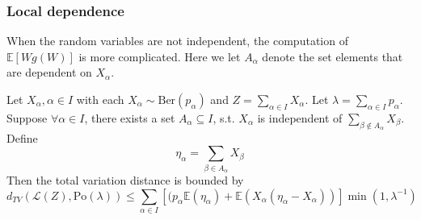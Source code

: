 \documentclass{article}
\begin{document}
\subsubsection{Local dependence}  
When the random variables are not independent, the computation of $\mathbb{E}[Wg(W)]$ is more complicated.  Here we let $A_\alpha$ denote the set elements that are dependent on $X_\alpha$.  

\begin{theorem}\label{thm:poisson_stein_local}
    Let $X_\alpha, \alpha \in I$ with each $X_\alpha \sim \text{Ber}(p_\alpha)$ and $Z = \sum_{\alpha \in I} X_\alpha$. Let $\lambda = \sum_{\alpha \in I} p_\alpha$. Suppose $\forall \alpha \in I$, there exists a set $A_\alpha \subseteq I$, s.t. $X_\alpha$ is independent of $\sum_{\beta \notin A_\alpha} X_\beta$. Define 
    \begin{equation*}
        \eta_\alpha = \sum_{\beta \in A_\alpha} X_\beta
    \end{equation*}
    Then the total variation distance is bounded by
    \begin{equation*}
        d_{TV}(\mathcal{L}(Z), \text{Po}(\lambda)) \leq \sum_{\alpha\in I}[(p_{\alpha}\mathbb{E}(\eta_{\alpha})+\mathbb{E}(X_{\alpha}(\eta_{\alpha}-X_{\alpha}))]\operatorname*{min}\left(1,\lambda^{-1}\right)
    \end{equation*}
\end{theorem}
\end{document}
